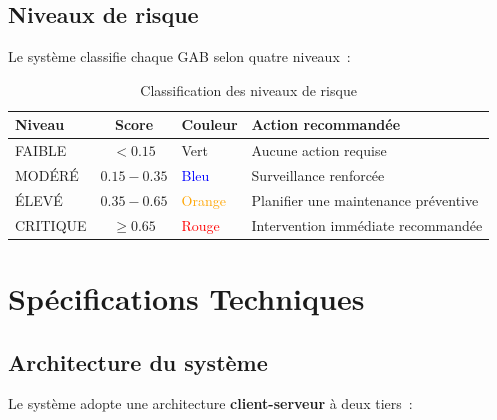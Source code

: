 \documentclass[a4paper,12pt]{report}
\begin{document}
\section{Niveaux de risque}

Le système classifie chaque GAB selon quatre niveaux~:

\begin{table}[h!]
\centering
\renewcommand{\arraystretch}{1.3}
\begin{tabular}{|l|c|l|l|}
\hline
\rowcolor{bpmblue!10}
\textbf{Niveau} & \textbf{Score} & \textbf{Couleur} & \textbf{Action recommandée} \\
\hline
FAIBLE & $< 0.15$ & \textcolor{green!60!black}{Vert} & Aucune action requise \\
\hline
MODÉRÉ & $0.15 - 0.35$ & \textcolor{blue}{Bleu} & Surveillance renforcée \\
\hline
ÉLEVÉ & $0.35 - 0.65$ & \textcolor{orange}{Orange} & Planifier une maintenance préventive \\
\hline
CRITIQUE & $\geq 0.65$ & \textcolor{red}{Rouge} & Intervention immédiate recommandée \\
\hline
\end{tabular}
\caption{Classification des niveaux de risque}
\end{table}

\chapter{Spécifications Techniques}

\section{Architecture du système}

Le système adopte une architecture \textbf{client-serveur} à deux tiers~:
\end{document}
